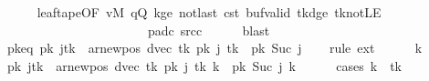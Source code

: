 \begin{isabellebody}
\ \ \ \ \isamarkupfalse%
\ leaf{\isacharunderscore}{\kern0pt}tape{\isacharbrackleft}{\kern0pt}OF\ vM\ qQ\ kge{}\ notlast\ c{\isacharunderscore}{\kern0pt}st\ buf{\isacharunderscore}{\kern0pt}valid\ tk{\isacharunderscore}{\kern0pt}dge{}\ tk{\isacharunderscore}{\kern0pt}notLE\isanewline
\ \ \ \ \ \ \ \ \ \ \ \ \ \ \ \ \ \ \ \ \ \ \ pad{\isacharunderscore}{\kern0pt}c\ src{\isacharunderscore}{\kern0pt}c{\isacharbrackright}{\kern0pt}\isanewline
\ \ \ \ \isamarkupfalse%
\ blast\isanewline
\ \ %
\isanewline
\ \ \isamarkupfalse%
\ pk{\isacharunderscore}{\kern0pt}eq{\isacharcolon}{\kern0pt}\ {\isachardoublequoteopen}{\isacharparenleft}{\kern0pt}{\isacharquery}{\kern0pt}pk\ j{\isacharparenright}{\kern0pt}{\isacharparenleft}{\kern0pt}{\isacharquery}{\kern0pt}tk\ {\isacharcolon}{\kern0pt}{\isacharequal}{\kern0pt}\ ar{\isacharunderscore}{\kern0pt}newpos\ {\isacharparenleft}{\kern0pt}dvec\ {\isacharquery}{\kern0pt}tk{\isacharparenright}{\kern0pt}\ {\isacharparenleft}{\kern0pt}{\isacharquery}{\kern0pt}pk\ j\ {\isacharquery}{\kern0pt}tk{\isacharparenright}{\kern0pt}{\isacharparenright}{\kern0pt}\ {\isacharequal}{\kern0pt}\ {\isacharquery}{\kern0pt}pk\ {\isacharparenleft}{\kern0pt}Suc\ j{\isacharparenright}{\kern0pt}{\isachardoublequoteclose}\isanewline
\ \ \isamarkupfalse%
\ {\isacharparenleft}{\kern0pt}rule\ ext{\isacharparenright}{\kern0pt}\isanewline
\ \ \ \ \isamarkupfalse%
\ k\isanewline
\ \ \ \ \isamarkupfalse%
\ {\isachardoublequoteopen}{\isacharparenleft}{\kern0pt}{\isacharparenleft}{\kern0pt}{\isacharquery}{\kern0pt}pk\ j{\isacharparenright}{\kern0pt}{\isacharparenleft}{\kern0pt}{\isacharquery}{\kern0pt}tk\ {\isacharcolon}{\kern0pt}{\isacharequal}{\kern0pt}\ ar{\isacharunderscore}{\kern0pt}newpos\ {\isacharparenleft}{\kern0pt}dvec\ {\isacharquery}{\kern0pt}tk{\isacharparenright}{\kern0pt}\ {\isacharparenleft}{\kern0pt}{\isacharquery}{\kern0pt}pk\ j\ {\isacharquery}{\kern0pt}tk{\isacharparenright}{\kern0pt}{\isacharparenright}{\kern0pt}{\isacharparenright}{\kern0pt}\ k\ {\isacharequal}{\kern0pt}\ {\isacharquery}{\kern0pt}pk\ {\isacharparenleft}{\kern0pt}Suc\ j{\isacharparenright}{\kern0pt}\ k{\isachardoublequoteclose}\isanewline
\ \ \ \ \isamarkupfalse%
\ {\isacharparenleft}{\kern0pt}cases\ {\isachardoublequoteopen}k\ {\isacharequal}{\kern0pt}\ {\isacharquery}{\kern0pt}tk{\isachardoublequoteclose}{\isacharparenright}{\kern0pt}\isanewline

\end{isabellebody}
